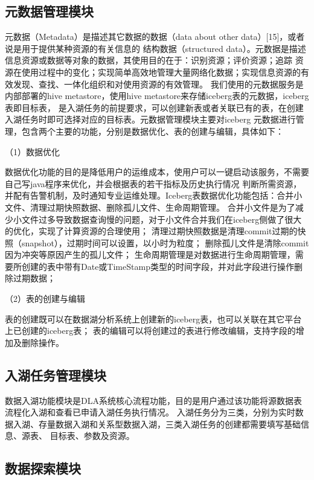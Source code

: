 \subsection{元数据管理模块}

元数据（Metadata）是描述其它数据的数据（data about other data）[15]，或者说是用于提供某种资源的有关信息的
结构数据（structured data）。元数据是描述信息资源或数据等对象的数据，其使用目的在于：识别资源；评价资源；追踪
资源在使用过程中的变化；实现简单高效地管理大量网络化数据；实现信息资源的有效发现、查找、一体化组织和对使用资源的有效管理。
我们使用的元数据服务是内部部署的hive metastore，使用hive metastore来存储iceberg表的元数据，iceberg表即目标表，
是入湖任务的前提要求，可以创建新表或者关联已有的表，在创建入湖任务时即可选择对应的目标表。元数据管理模块主要对iceberg
元数据进行管理，包含两个主要的功能，分别是数据优化、表的创建与编辑，具体如下：

（1）数据优化

数据优化功能的目的是降低用户的运维成本，使用户可以一键启动该服务，不需要自己写java程序来优化，并会根据表的若干指标及历史执行情况
判断所需资源，并配有告警机制，及时通知专业运维处理。Iceberg表数据优化功能包括：合并小文件、清理过期快照数据、删除孤儿文件、生命周期管理。
合并小文件是为了减少小文件过多导致数据查询慢的问题，对于小文件合并我们在iceberg侧做了很大的优化，实现了计算资源的合理使用；
清理过期快照数据是清理commit过期的快照（snapshot），过期时间可以设置，以小时为粒度；
删除孤儿文件是清除commit因为冲突等原因产生的孤儿文件；
生命周期管理是对数据进行生命周期管理，需要所创建的表中带有Date或TimeStamp类型的时间字段，并对此字段进行操作删除过期数据；

（2）表的创建与编辑

表的创建既可以在数据湖分析系统上创建新的iceberg表，也可以关联在其它平台上已创建的iceberg表；
表的编辑可以将创建过的表进行修改编辑，支持字段的增加及删除操作。

\subsection{入湖任务管理模块}

数据入湖功能模块是DLA系统核心流程功能，目的是用户通过该功能将源数据表流程化入湖和查看已申请入湖任务执行情况。
入湖任务分为三类，分别为实时数据入湖、存量数据入湖和关系型数据入湖，三类入湖任务的创建都需要填写基础信息、源表、
目标表、参数及资源。

\subsection{数据探索模块}

